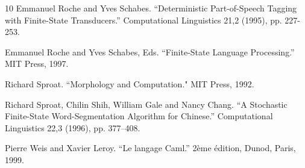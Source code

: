 \documentclass[12pt]{article}
\begin{document}
\begin{thebibliography}{10}
 Emmanuel Roche and Yves Schabes. ``Deterministic Part-of-Speech
Tagging with Finite-State Transducers.'' 
Computational Linguistics 21,2 (1995), pp. 227-253.

 Emmanuel Roche and Yves Schabes, Eds.
``Finite-State Language Processing.'' MIT Press, 1997.

 Richard Sproat. ``Morphology and Computation."
MIT Press, 1992.

 Richard Sproat, Chilin Shih, William Gale and Nancy Chang.
``A Stochastic Finite-State Word-Segmentation Algorithm for Chinese.''
Computational Linguistics 22,3 (1996), pp. 377--408.

 Pierre Weis and Xavier Leroy. ``Le langage Caml.'' 
2\`eme \'edition, Dunod, Paris, 1999. 

\end{thebibliography}
\end{document}
